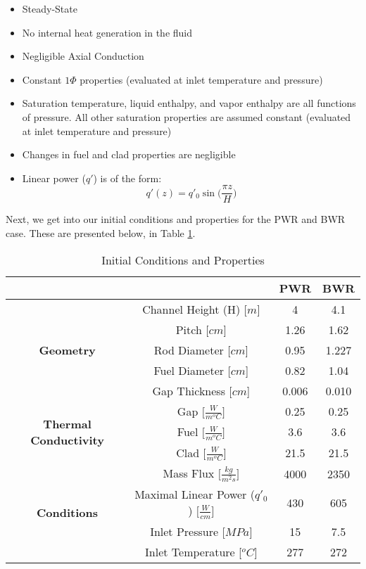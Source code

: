 \documentclass{article}
\begin{document}
\begin{itemize}
    \item[\circled{1}] Steady-State
    \item[\circled{2}] No internal heat generation in the fluid
    \item[\circled{3}] Negligible Axial Conduction
    \item[\circled{4}] Constant $1\Phi$ properties (evaluated at inlet temperature and pressure)
    \item[\circled{5}] Saturation temperature, liquid enthalpy, and vapor enthalpy are all functions of pressure. All other saturation properties are assumed constant (evaluated at inlet temperature and pressure)
    \item[\circled{6}] Changes in fuel and clad properties are negligible 
    \item[\circled{7}] Linear power ($q'$) is of the form:
    \begin{equation}
        q'(z) = q'_0\sin\bigr(\frac{\pi z}{H}\bigr)
    \end{equation}
\end{itemize}

Next, we get into our initial conditions and properties for the PWR and BWR case. These are presented below, in Table \ref{tab:ICs}.

\begin{table}[!hp!]
    \centering
    \caption{Initial Conditions and Properties}
    \label{tab:ICs}
    \renewcommand{\arraystretch}{1.5}
    \begin{tabular}{|c|c|c|c|}
         \cline{3-4}
         \multicolumn{2}{c|}{} & \textbf{PWR} & \textbf{BWR}\\
         \cline{3-4}
         \bottomrule
         \multirow{5}{*}{\textbf{Geometry}} &Channel Height (H) [$m$] & 4 & 4.1 \\
         &Pitch [$cm$]& 1.26 & 1.62 \\
         &Rod Diameter [$cm$]& 0.95& 1.227\\
         &Fuel Diameter [$cm$]& 0.82 & 1.04\\
         &Gap Thickness [$cm$]& 0.006 & 0.010 \\
         \toprule
         \bottomrule
         \multirow{3}{*}{\textbf{Thermal Conductivity}} & Gap $\bigr[\frac{W}{m^oC}\bigr]$& 0.25 & 0.25 \\
         &Fuel $\bigr[\frac{W}{m^oC}\bigr]$& 3.6 & 3.6\\
         &Clad $\bigr[\frac{W}{m^oC}\bigr]$& 21.5 & 21.5\\
         \toprule
         \bottomrule
         \multirow{4}{*}{\textbf{Conditions}}& Mass Flux $\bigr[\frac{kg}{m^2s}\bigr]$& 4000 & 2350 \\
         & Maximal Linear Power ($q'_0$) $\bigr[\frac{W}{cm}\bigr]$& 430 & 605 \\
         & Inlet Pressure [$MPa$]& 15 & 7.5 \\
         & Inlet Temperature [$^oC$]& 277 & 272 \\
         \toprule
         
    \end{tabular}
    
\end{table}
\end{document}
